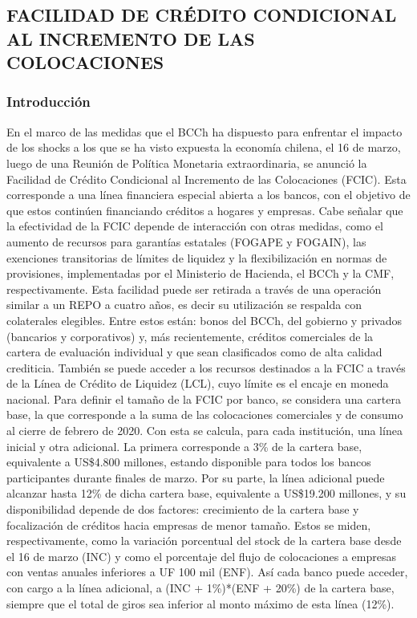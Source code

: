 \documentclass[
]{book}
\begin{document}
\hypertarget{R3.1}{%
\subsection*{\texorpdfstring{\textbf{FACILIDAD DE CRÉDITO CONDICIONAL AL INCREMENTO DE LAS COLOCACIONES}}{FACILIDAD DE CRÉDITO CONDICIONAL AL INCREMENTO DE LAS COLOCACIONES}}\label{R3.1}}

\hypertarget{R3.2}{%
\subsubsection*{\texorpdfstring{\textbf{Introducción}}{Introducción}}\label{R3.2}}

En el marco de las medidas que el BCCh ha dispuesto para
enfrentar el impacto de los shocks a los que se ha visto expuesta
la economía chilena, el 16 de marzo, luego de una Reunión de
Política Monetaria extraordinaria, se anunció la Facilidad de
Crédito Condicional al Incremento de las Colocaciones (FCIC).
Esta corresponde a una línea financiera especial abierta a los
bancos, con el objetivo de que estos continúen financiando
créditos a hogares y empresas. Cabe señalar que la efectividad
de la FCIC depende de interacción con otras medidas, como
el aumento de recursos para garantías estatales (FOGAPE y
FOGAIN), las exenciones transitorias de límites de liquidez y la
flexibilización en normas de provisiones, implementadas por el
Ministerio de Hacienda, el BCCh y la CMF, respectivamente.
Esta facilidad puede ser retirada a través de una operación
similar a un REPO a cuatro años, es decir su utilización se
respalda con colaterales elegibles. Entre estos están: bonos del
BCCh, del gobierno y privados (bancarios y corporativos) y, más
recientemente, créditos comerciales de la cartera de evaluación
individual y que sean clasificados como de alta calidad crediticia.
También se puede acceder a los recursos destinados a la FCIC a
través de la Línea de Crédito de Liquidez (LCL), cuyo límite es el
encaje en moneda nacional.
Para definir el tamaño de la FCIC por banco, se considera una
cartera base, la que corresponde a la suma de las colocaciones
comerciales y de consumo al cierre de febrero de 2020. Con esta
se calcula, para cada institución, una línea inicial y otra adicional.
La primera corresponde a 3\% de la cartera base, equivalente a
US\$4.800 millones, estando disponible para todos los bancos
participantes durante finales de marzo. Por su parte, la línea
adicional puede alcanzar hasta 12\% de dicha cartera base,
equivalente a US\$19.200 millones, y su disponibilidad depende
de dos factores: crecimiento de la cartera base y focalización
de créditos hacia empresas de menor tamaño. Estos se miden,
respectivamente, como la variación porcentual del stock de la
cartera base desde el 16 de marzo (INC) y como el porcentaje del
flujo de colocaciones a empresas con ventas anuales inferiores a
UF 100 mil (ENF). Así cada banco puede acceder, con cargo a la
línea adicional, a (INC + 1\%)*(ENF + 20\%) de la cartera base,
siempre que el total de giros sea inferior al monto máximo de
esta línea (12\%).
\end{document}
